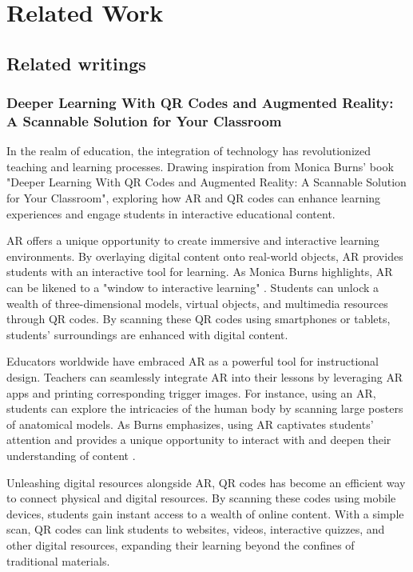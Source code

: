 \chapter{Related Work}\label{cap:relatedwork}
\section{Related writings}
\subsection*{Deeper Learning With QR Codes and Augmented Reality: A Scannable Solution for Your Classroom}

In the realm of education, the integration of technology has revolutionized teaching and learning processes.  Drawing inspiration from Monica Burns' book "Deeper Learning With QR Codes and Augmented Reality: A Scannable Solution for Your Classroom", exploring how \ac{AR} and \ac{QR} codes can enhance learning experiences and engage students in interactive educational content.

\acf{AR} offers a unique opportunity to create immersive and interactive learning environments. By overlaying digital content onto real-world objects, \ac{AR} provides students with an interactive tool for learning. As Monica Burns highlights, \ac{AR} can be likened to a "window to interactive learning" \cite{Burns2016}. Students can unlock a wealth of three-dimensional models, virtual objects, and multimedia resources through \acf{QR} codes. By scanning these \ac{QR} codes using smartphones or tablets, students' surroundings are enhanced with digital content.

Educators worldwide have embraced \ac{AR} as a powerful tool for instructional design. Teachers can seamlessly integrate \ac{AR} into their lessons by leveraging \ac{AR} apps and printing corresponding trigger images. For instance, using an \acf{AR}, students can explore the intricacies of the human body by scanning large posters of anatomical models. As Burns emphasizes, using \ac{AR} captivates students' attention and provides a unique opportunity to interact with and deepen their understanding of content \cite{Burns2016}.

Unleashing digital resources alongside \ac{AR}, \ac{QR} codes has become an efficient way to connect physical and digital resources. By scanning these codes using mobile devices, students gain instant access to a wealth of online content. With a simple scan, \ac{QR} codes can link students to websites, videos, interactive quizzes, and other digital resources, expanding their learning beyond the confines of traditional materials.

